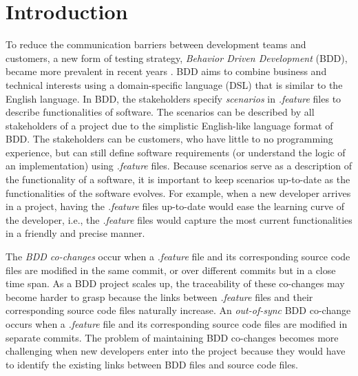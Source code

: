 
\section{Introduction}

To reduce the communication barriers between development teams and customers, a new form of testing strategy, \textit{Behavior Driven Development} (BDD), became more prevalent in recent years \cite{solis2011study}. BDD aims to combine business and technical interests using a domain-specific language (DSL) that is similar to the English language. In BDD, the stakeholders specify \textit{scenarios} in \textit{.feature} files to describe functionalities of software. The scenarios can be described by all stakeholders of a project due to the simplistic English-like language format of BDD. The stakeholders can be customers, who have little to no programming experience, but can still define software requirements (or understand the logic of an implementation) using \textit{.feature} files. Because scenarios serve as a description of the functionality of a software, it is important to keep scenarios up-to-date as the functionalities of the software evolves. For example, when  a new developer arrives in a project, having the \textit{.feature} files up-to-date would ease the learning curve of the developer, i.e., the \textit{.feature} files would capture the most current functionalities in a friendly and precise manner.

The \textit{BDD co-changes} occur when a \textit{.feature} file and its corresponding source code files are modified in the same commit, or over different commits but in a close time span. As a BDD project scales up, the traceability of these co-changes may become harder to grasp because the links between \textit{.feature} files and their corresponding source code files naturally increase. An \textit{out-of-sync} BDD co-change occurs when a \textit{.feature} file and its corresponding source code files are modified in separate commits. The problem of maintaining BDD co-changes becomes more challenging when new developers enter into the project because they would have to identify the existing links between BDD files and source code files.


